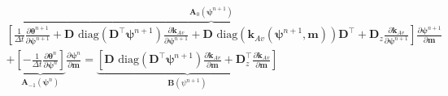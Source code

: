 \begin{align}
\label{eq:richards-timestep-deriv-blocks}
\overbrace{
    \left[
        \frac{1}{\Delta t}
        \frac{\partial \boldsymbol{\theta}^{n+1}}{\partial\boldsymbol{\psi}^{n+1}}
        +\mathbf{D}
        \text{ diag}\left( \mathbf{D}^{\top} \boldsymbol{\psi}^{n+1} \right)
        \frac{\partial \mathbf{k}_{Av}}{\partial\boldsymbol{\psi}^{n+1}}
        +\mathbf{D}
        \text{ diag}\left( \mathbf{k}_{Av}(\boldsymbol{\psi}^{n+1},\mathbf{m}) \right)
        \mathbf{D}^{\top}
        + \mathbf{D}_{z}
        \frac{\partial \mathbf{k}_{Av}}{\partial\boldsymbol{\psi}^{n+1}}
    \right]
}^{\mathbf{A}_0(\boldsymbol{\psi}^{n+1})}
\frac{\partial \boldsymbol{\psi}^{n+1}}{\partial\mathbf{m}}
\nonumber\\
+
\underbrace{
    \left[
        -\frac{1}{\Delta t}
        \frac{\partial \boldsymbol{\theta}^n}{\partial\boldsymbol{\psi}^n}
    \right]
}_{\mathbf{A}_{-1}(\boldsymbol{\psi}^n)}
\frac{\partial \boldsymbol{\psi}^n}{\partial\mathbf{m}}
=
\underbrace{
\left[
    \mathbf{D}
    \text{ diag}\left( \mathbf{D}^{\top} \boldsymbol{\psi}^{n+1} \right)
    \frac{\partial \mathbf{k}_{Av}}{\partial\mathbf{m}}
    +\mathbf{D}^{\top}_{z}
    \frac{\partial \mathbf{k}_{Av}}{\partial\mathbf{m}}
\right]
}_{\mathbf{B}(\psi^{n+1})}&
\end{align}
